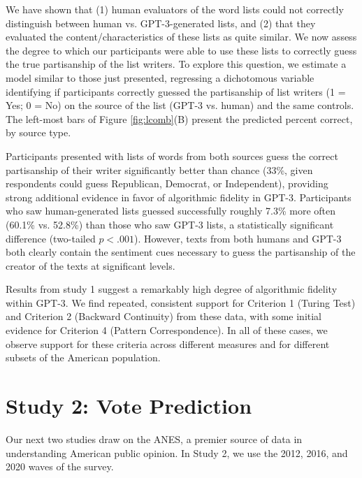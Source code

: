 \documentclass[11pt]{article}
\begin{document}
We have shown that (1) human evaluators of the word lists could not correctly distinguish between human vs. GPT-3-generated lists, and (2) that they evaluated the content/characteristics of these lists as quite similar. We now assess the degree to which our participants were able to use these lists to correctly guess the true partisanship of the list writers. %
To explore this question, we estimate a model similar to those just presented, regressing a  dichotomous variable identifying if participants correctly guessed the partisanship of list writers (1 = Yes; 0 = No) on the source of the list (GPT-3 vs. human) and the same controls. The left-most bars of Figure \ref{fig:lcomb}(B) present the predicted percent correct, by source type.

Participants presented with lists of words from both sources guess the correct partisanship of their writer significantly better than chance (33\%, given respondents could guess Republican, Democrat, or Independent), providing strong additional evidence in favor of algorithmic fidelity in GPT-3. Participants who saw human-generated lists guessed successfully roughly 7.3\% more often (60.1\% vs. 52.8\%) than those who saw GPT-3 lists, a statistically significant difference (two-tailed $p<.001$). However, texts from both humans and GPT-3 both clearly contain the sentiment cues necessary to guess the partisanship of the creator of the texts at significant levels.

Results from study 1 suggest a remarkably high degree of algorithmic fidelity within GPT-3. We find repeated, consistent support for Criterion 1 (Turing Test) and Criterion 2 (Backward Continuity) from these data, with some initial evidence for Criterion 4 (Pattern Correspondence). In all of these cases, we observe support for these criteria across different measures and for different subsets of the American population. %



\section{Study 2: Vote Prediction}
Our next two studies draw on the ANES, a premier source of data in understanding American public opinion. %
In Study 2, we use the 2012, 2016, and 2020 waves of the survey.
\end{document}
